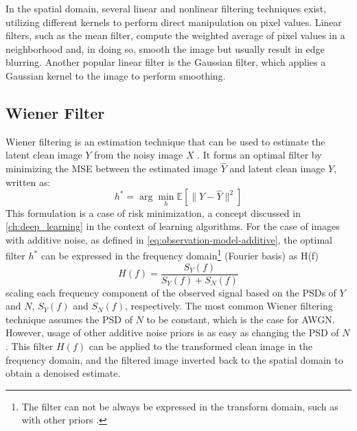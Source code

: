 In the spatial domain, several linear and nonlinear filtering techniques exist, utilizing different kernels to perform direct manipulation on pixel values. Linear filters, such as the mean filter, compute the weighted average of pixel values in a neighborhood and, in doing so, smooth the image but usually result in edge blurring. Another popular linear filter is the Gaussian filter, which applies a Gaussian kernel to the image to perform smoothing.

\subsection{Wiener Filter}\label{sec:wiener-filter}
Wiener filtering is an estimation technique that can be used to estimate the latent clean image $Y$ from the noisy image $X$ \cite{oppenheimSignalsSystemsInference2017}. It forms an optimal filter by minimizing the \gls{MSE} between the estimated image $\hat{Y}$ and latent clean image $Y$, written as:
\begin{equation}\label{eq:wiener-mse}
    h^* = \arg \min_{h} \mathbb{E} \left[ \| Y - \hat{Y} \|^2 \right]
\end{equation}
This formulation is a case of risk minimization, a concept discussed in \cref{ch:deep_learning} in the context of learning algorithms. For the case of images with additive noise, as defined in \cref{eq:observation-model-additive}, the optimal filter $h^*$ can be expressed in the frequency domain\footnote{The filter can not be always be expressed in the transform domain, such as with other priors \cite{oppenheimSignalsSystemsInference2017}.} (Fourier basis) as H(f)
\begin{equation}
    H(f) = \frac{S_Y(f)}{S_Y(f) + S_N(f)}
\end{equation}
scaling each frequency component of the observed signal based on the \glspl{PSD} of $Y$ and $N$, $S_Y(f)$ and $S_N(f)$, respectively. The most common Wiener filtering technique assumes the \gls{PSD} of $N$ to be constant, which is the case for \gls{AWGN}. However, usage of other additive noise priors is as easy as changing the \gls{PSD} of $N$. This filter $H(f)$ can be applied to the transformed clean image in the frequency domain, and the filtered image inverted back to the spatial domain to obtain a denoised estimate.

